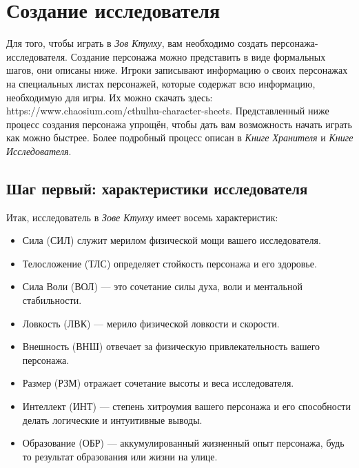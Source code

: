 \documentclass[letterpaper,twocolumn,openany, twoside, 11pt, usenames]{cocbook}
\newlength{\seplinewidth}
\newlength{\seplinesep}
\newcommand*{\sepline}{%
  \par
  \vspace{\dimexpr\seplinesep+.5\parskip}%
  \cleaders\vbox{%
    \begingroup %
      \color{sepline}%
      \hrule width\linewidth height\seplinewidth
    \endgroup
  }\vskip\seplinewidth
  \vspace{\dimexpr\seplinesep-.5\parskip}%
}
\begin{document}
\section*{\nohyphens{Создание исследователя}}

Для того, чтобы играть в {\it Зов Ктулху}, вам необходимо создать персонажа-исследователя. Создание персонажа можно представить в виде формальных шагов, они описаны ниже. Игроки записывают информацию о своих персонажах на специальных листах персонажей, которые содержат всю информацию, необходимую для игры. Их можно скачать здесь: https://www.chaosium.com/cthulhu-character-sheets.
Представленный ниже процесс создания персонажа упрощён, чтобы дать вам возможность начать играть как можно быстрее. Более подробный процесс описан в {\it Книге Хранителя} и {\it Книге Исследователя}.




\subsection*{Шаг первый: характеристики исследователя}
Итак, исследователь в {\it Зове Ктулху} имеет восемь характеристик:

\begin{itemize}[leftmargin=4mm]
  \item Сила (СИЛ) служит мерилом физической мощи вашего исследователя.
  \item Телосложение (ТЛС) определяет стойкость персонажа и его здоровье.
  \item Сила Воли (ВОЛ) --- это сочетание силы духа, воли и ментальной стабильности.
  \item Ловкость (ЛВК) --- мерило физической ловкости и скорости.
  \item Внешность (ВНШ) отвечает за физическую привлекательность вашего персонажа.
  \item Размер (РЗМ) отражает сочетание высоты и веса исследователя.
  \item Интеллект (ИНТ) --- степень хитроумия вашего персонажа и его способности делать логические и интуитивные выводы.
  \item Образование (ОБР) --- аккумулированный жизненный опыт персонажа, будь то результат образования или жизни на улице.
\end{itemize}
\end{document}
